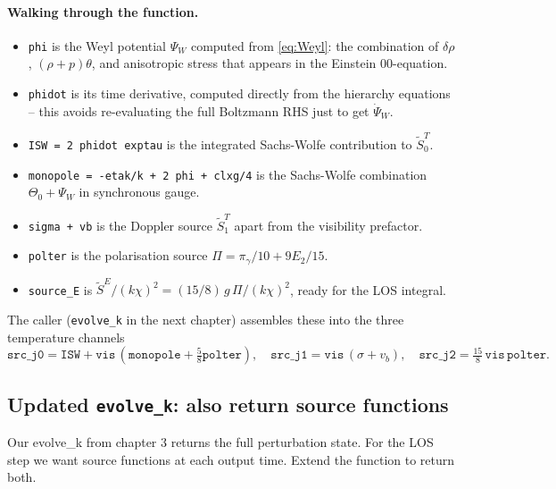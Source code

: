 \paragraph{Walking through the function.}
\begin{itemize}
  \item \texttt{phi} is the Weyl potential $\Psi_W$ computed from \cref{eq:Weyl}: the combination of $\delta\rho$, $(\rho + p)\theta$, and anisotropic stress that appears in the Einstein 00-equation.
  \item \texttt{phidot} is its time derivative, computed directly from the hierarchy equations -- this avoids re-evaluating the full Boltzmann RHS just to get $\dot{\Psi}_W$.
  \item \texttt{ISW = 2 phidot exptau} is the integrated Sachs-Wolfe contribution to $\widetilde S^T_0$.
  \item \texttt{monopole = -etak/k + 2 phi + clxg/4} is the Sachs-Wolfe combination $\Theta_0 + \Psi_W$ in synchronous gauge.
  \item \texttt{sigma + vb} is the Doppler source $\widetilde S^T_1$ apart from the visibility prefactor.
  \item \texttt{polter} is the polarisation source $\Pi = \pi_\gamma/10 + 9 E_2/15$.
  \item \texttt{source\_E} is $\widetilde S^E/(k\chi)^2 = (15/8)\, g\, \Pi/(k\chi)^2$, ready for the LOS integral.
\end{itemize}

The caller (\texttt{evolve\_k} in the next chapter) assembles these into the three temperature channels
\[
  \texttt{src\_j0} = \texttt{ISW} + \texttt{vis}\,(\texttt{monopole} + \tfrac{5}{8}\texttt{polter}),
  \quad
  \texttt{src\_j1} = \texttt{vis}\,(\sigma + v_b),
  \quad
  \texttt{src\_j2} = \tfrac{15}{8}\,\texttt{vis}\,\texttt{polter}.
\]

\subsection{Updated \texttt{evolve\_k}: also return source functions}

Our evolve\_k from chapter 3 returns the full perturbation state. For the LOS step we want source functions at each output time. Extend the function to return both.

